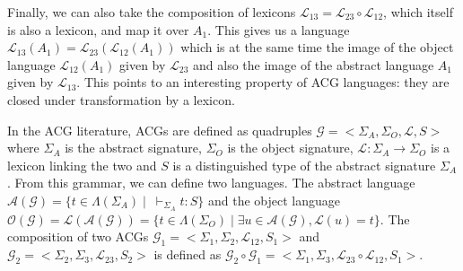 Finally, we can also take the composition of lexicons $\mathcal{L}_{13}
= \mathcal{L}_{23} \circ \mathcal{L}_{12}$, which itself is also a
lexicon, and map it over $A_1$. This gives us a language
$\mathcal{L}_{13}(A_1) = \mathcal{L}_{23}(\mathcal{L}_{12}(A_1))$ which
is at the same time the image of the object language
$\mathcal{L}_{12}(A_1)$ given by $\mathcal{L}_{23}$ and also the image
of the abstract language $A_1$ given by $\mathcal{L}_{13}$. This points
to an interesting property of ACG languages: they are closed under
transformation by a lexicon.

In the ACG literature, ACGs are defined as quadruples $\mathcal{G} =
\mathopen{<}\Sigma_A, \Sigma_O, \mathcal{L}, S\mathclose{>}$ where
$\Sigma_A$ is the abstract signature, $\Sigma_O$ is the object
signature, $\mathcal{L} : \Sigma_A \to \Sigma_O$ is a lexicon linking
the two and $S$ is a distinguished type of the abstract signature
$\Sigma_A$. From this grammar, we can define two languages. The abstract
language $\mathcal{A}(\mathcal{G}) = \{t \in \Lambda(\Sigma_A) \mid
\ \vdash_{\Sigma_A} t : S\}$ and the object language
$\mathcal{O}(\mathcal{G}) = \mathcal{L}(\mathcal{A}(\mathcal{G})) = \{t
\in \Lambda(\Sigma_O) \mid \exists u \in \mathcal{A}(\mathcal{G}),
\mathcal{L}(u) = t\}$. The composition of two ACGs $\mathcal{G}_1 =
\mathopen{<}\Sigma_1, \Sigma_2, \mathcal{L}_{12}, S_1\mathclose{>}$ and
$\mathcal{G}_2 = \mathopen{<}\Sigma_2, \Sigma_3, \mathcal{L}_{23},
S_2\mathclose{>}$ is defined as $\mathcal{G}_2 \circ \mathcal{G}_1 =
\mathopen{<}\Sigma_1, \Sigma_3, \mathcal{L}_{23} \circ \mathcal{L}_{12},
S_1\mathclose{>}$.

